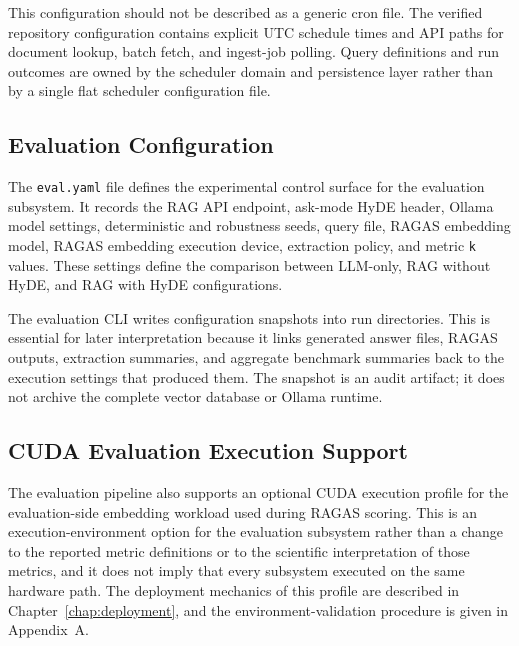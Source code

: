 This configuration should not be described as a generic cron file. The verified repository configuration contains explicit UTC schedule times and API paths for document lookup, batch fetch, and ingest-job polling. Query definitions and run outcomes are owned by the scheduler domain and persistence layer rather than by a single flat scheduler configuration file.

\subsection{Evaluation Configuration}

The \texttt{eval.yaml} file defines the experimental control surface for the evaluation subsystem. It records the RAG API endpoint, ask-mode HyDE header, Ollama model settings, deterministic and robustness seeds, query file, RAGAS embedding model, RAGAS embedding execution device, extraction policy, and metric \texttt{k} values. These settings define the comparison between LLM-only, RAG without HyDE, and RAG with HyDE configurations.

The evaluation CLI writes configuration snapshots into run directories. This is essential for later interpretation because it links generated answer files, RAGAS outputs, extraction summaries, and aggregate benchmark summaries back to the execution settings that produced them. The snapshot is an audit artifact; it does not archive the complete vector database or Ollama runtime.

\subsection{CUDA Evaluation Execution Support}

The evaluation pipeline also supports an optional CUDA execution profile for the evaluation-side embedding workload used during RAGAS scoring. This is an execution-environment option for the evaluation subsystem rather than a change to the reported metric definitions or to the scientific interpretation of those metrics, and it does not imply that every subsystem executed on the same hardware path. The deployment mechanics of this profile are described in Chapter~\ref{chap:deployment}, and the environment-validation procedure is given in Appendix~A.

